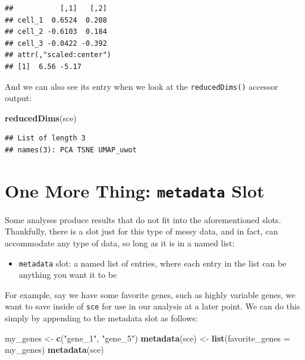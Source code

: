 \documentclass[]{book}
\newenvironment{Shaded}{\begin{snugshade}}{\end{snugshade}}
\newcommand{\DataTypeTok}[1]{\textcolor[rgb]{0.13,0.29,0.53}{#1}}
\newcommand{\KeywordTok}[1]{\textcolor[rgb]{0.13,0.29,0.53}{\textbf{#1}}}
\newcommand{\NormalTok}[1]{#1}
\newcommand{\StringTok}[1]{\textcolor[rgb]{0.31,0.60,0.02}{#1}}
\providecommand{\tightlist}{%
  \setlength{\itemsep}{0pt}\setlength{\parskip}{0pt}}
\begin{document}
\begin{verbatim}
##           [,1]   [,2]
## cell_1  0.6524  0.208
## cell_2 -0.6103  0.184
## cell_3 -0.0422 -0.392
## attr(,"scaled:center")
## [1]  6.56 -5.17
\end{verbatim}

And we can also see its entry when we look at the \texttt{reducedDims()} accessor output:

\begin{Shaded}
\begin{Highlighting}[]
\KeywordTok{reducedDims}\NormalTok{(sce)}
\end{Highlighting}
\end{Shaded}

\begin{verbatim}
## List of length 3
## names(3): PCA TSNE UMAP_uwot
\end{verbatim}

\hypertarget{one-more-thing-metadata-slot}{%
\section{\texorpdfstring{One More Thing: \texttt{metadata} Slot}{One More Thing: metadata Slot}}\label{one-more-thing-metadata-slot}}

Some analyses produce results that do not fit into the aforementioned slots. Thankfully, there is a slot just for this type of messy data, and in fact, can accommodate any type of data, so long as it is in a named list:

\begin{itemize}
\tightlist
\item
  \texttt{metadata} slot: a named list of entries, where each entry in the list can be anything you want it to be
\end{itemize}

For example, say we have some favorite genes, such as highly variable genes, we want to save inside of \texttt{sce} for use in our analysis at a later point. We can do this simply by appending to the metadata slot as follows:

\begin{Shaded}
\begin{Highlighting}[]
\NormalTok{my_genes <-}\StringTok{ }\KeywordTok{c}\NormalTok{(}\StringTok{"gene_1"}\NormalTok{, }\StringTok{"gene_5"}\NormalTok{)}
\KeywordTok{metadata}\NormalTok{(sce) <-}\StringTok{ }\KeywordTok{list}\NormalTok{(}\DataTypeTok{favorite_genes =}\NormalTok{ my_genes)}
\KeywordTok{metadata}\NormalTok{(sce)}
\end{Highlighting}
\end{Shaded}
\end{document}
